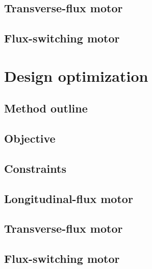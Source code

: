     \subsection{Transverse-flux motor}          \label{Chapter:PMLSM design RSM/RSM for motors/transverse flux}
    \subsection{Flux-switching motor}           \label{Chapter:PMLSM design RSM/RSM for motors/flux switching}


\section{Design optimization}                   \label{Chapter:PMLSM design RSM/design optimization}
    \subsection{Method outline}                 \label{Chapter:PMLSM design RSM/design optimization/method outline}
        \subsection{Objective}                  \label{Chapter:PMLSM design RSM/design optimization/method outline/objectives}
        \subsection{Constraints}                \label{Chapter:PMLSM design RSM/design optimization/method outline/constraints}
    \subsection{Longitudinal-flux motor}        \label{Chapter:PMLSM design RSM/design optimization/longitudinal flux}
    \subsection{Transverse-flux motor}          \label{Chapter:PMLSM design RSM/design optimization/transverse flux}
    \subsection{Flux-switching motor}           \label{Chapter:PMLSM design RSM/design optimization/flux switching}


